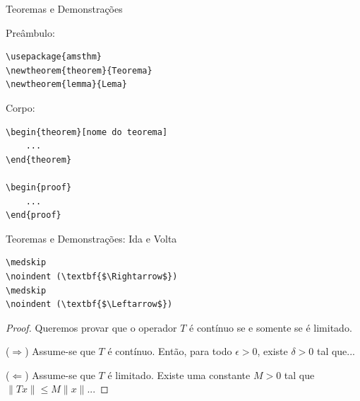\documentclass[aspectratio=169,xcolor=dvipsnames]{beamer}
\begin{document}
\begin{frame}[fragile]{Teoremas e Demonstrações}

Preâmbulo:
\begin{lstlisting}
\usepackage{amsthm}
\newtheorem{theorem}{Teorema}
\newtheorem{lemma}{Lema}
\end{lstlisting}

Corpo:
\begin{lstlisting}
\begin{theorem}[nome do teorema]
    ...
\end{theorem}

\begin{proof}
    ...
\end{proof}
\end{lstlisting}

\end{frame}

\begin{frame}[fragile]{Teoremas e Demonstrações: Ida e Volta}

\begin{lstlisting}
\medskip
\noindent (\textbf{$\Rightarrow$}) 
\medskip
\noindent (\textbf{$\Leftarrow$})
\end{lstlisting}

    \begin{proof}
    Queremos provar que o operador $T$ é contínuo se e somente se é limitado.

    \medskip
    \noindent (\textbf{$\Rightarrow$}) Assume-se que $T$ é contínuo. Então, para todo $\epsilon > 0$, existe $\delta > 0$ tal que...

    \medskip
    \noindent (\textbf{$\Leftarrow$}) Assume-se que $T$ é limitado. Existe uma constante $M > 0$ tal que $\|Tx\| \le M\|x\|$...
    \end{proof}

\end{frame}
\end{document}
